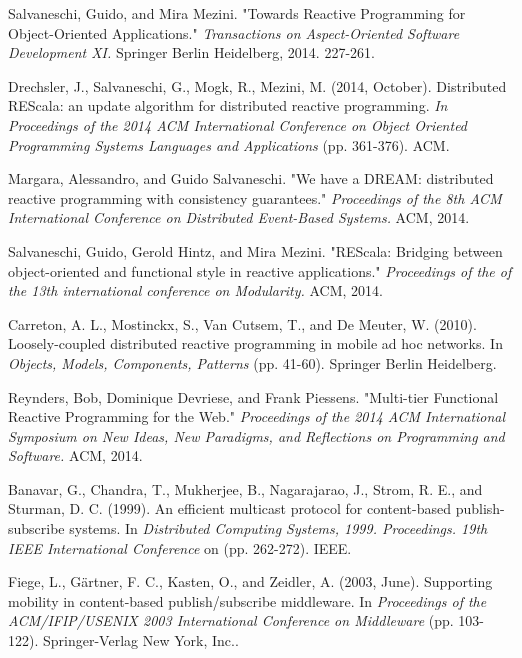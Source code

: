 \documentclass{sigplanconf}
\begin{document}



\begin{thebibliography}{}
\softraggedright

 Salvaneschi, Guido, and Mira Mezini. "Towards Reactive Programming for Object-Oriented Applications." {\em Transactions on Aspect-Oriented Software Development XI.} Springer Berlin Heidelberg, 2014. 227-261.

 Drechsler, J., Salvaneschi, G., Mogk, R.,  Mezini, M. (2014, October). Distributed REScala: an update algorithm for distributed reactive programming. {\em  In Proceedings of the 2014 ACM International Conference on Object Oriented Programming Systems Languages and Applications} (pp. 361-376). ACM.

 Margara, Alessandro, and Guido Salvaneschi. "We have a DREAM: distributed reactive programming with consistency guarantees." {\em Proceedings of the 8th ACM International Conference on Distributed Event-Based Systems.} ACM, 2014.

 Salvaneschi, Guido, Gerold Hintz, and Mira Mezini. "REScala: Bridging between object-oriented and functional style in reactive applications." {\em Proceedings of the of the 13th international conference on Modularity.} ACM, 2014.

 Carreton, A. L., Mostinckx, S., Van Cutsem, T., and De Meuter, W. (2010). Loosely-coupled distributed reactive programming in mobile ad hoc networks. In {\em Objects, Models, Components, Patterns } (pp. 41-60). Springer Berlin Heidelberg.

 Reynders, Bob, Dominique Devriese, and Frank Piessens. "Multi-tier Functional Reactive Programming for the Web." {\em  Proceedings of the 2014 ACM International Symposium on New Ideas, New Paradigms, and Reflections on Programming and Software.} ACM, 2014.

 Banavar, G., Chandra, T., Mukherjee, B., Nagarajarao, J., Strom, R. E., and Sturman, D. C. (1999). An efficient multicast protocol for content-based publish-subscribe systems. In {\em Distributed Computing Systems, 1999. Proceedings. 19th IEEE International Conference} on (pp. 262-272). IEEE.

 Fiege, L., Gärtner, F. C., Kasten, O., and Zeidler, A. (2003, June). Supporting mobility in content-based publish/subscribe middleware. In {\em Proceedings of the ACM/IFIP/USENIX 2003 International Conference on Middleware } (pp. 103-122). Springer-Verlag New York, Inc..


\end{thebibliography}
\end{document}
